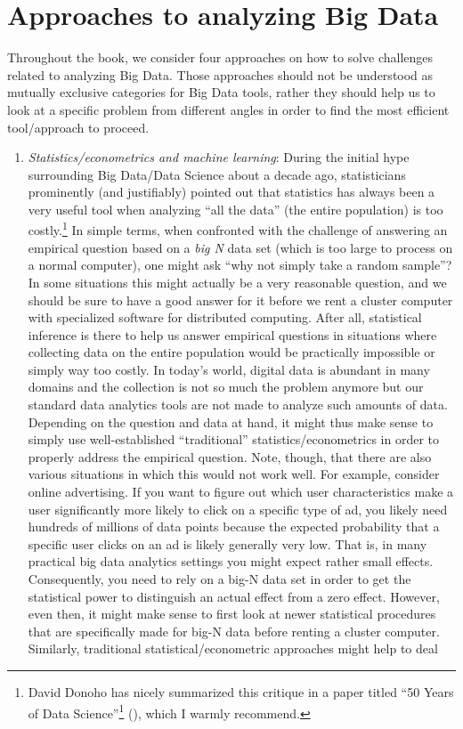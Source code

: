\documentclass[
  12pt,
]{style/krantz}
\renewcommand{\href}[2]{#2\footnote{\url{#1}}}
\begin{document}
\hypertarget{approaches-to-analyzing-big-data}{%
\chapter{Approaches to analyzing Big Data}\label{approaches-to-analyzing-big-data}}

Throughout the book, we consider four approaches on how to solve challenges related to analyzing Big Data. Those approaches should not be understood as mutually exclusive categories for Big Data tools, rather they should help us to look at a specific problem from different angles in order to find the most efficient tool/approach to proceed.

\begin{enumerate}
\def\labelenumi{\arabic{enumi}.}
\item
  \emph{Statistics/econometrics and machine learning}: During the initial hype surrounding Big Data/Data Science about a decade ago, statisticians prominently (and justifiably) pointed out that statistics has always been a very useful tool when analyzing ``all the data'' (the entire population) is too costly.\footnote{David Donoho has nicely summarized this critique in a paper titled \href{https://doi.org/10.1080/10618600.2017.1384734}{``50 Years of Data Science''} (\citet{donoho_2017}), which I warmly recommend.} In simple terms, when confronted with the challenge of answering an empirical question based on a \emph{big N} data set (which is too large to process on a normal computer), one might ask ``why not simply take a random sample''? In some situations this might actually be a very reasonable question, and we should be sure to have a good answer for it before we rent a cluster computer with specialized software for distributed computing. After all, statistical inference is there to help us answer empirical questions in situations where collecting data on the entire population would be practically impossible or simply way too costly. In today's world, digital data is abundant in many domains and the collection is not so much the problem anymore but our standard data analytics tools are not made to analyze such amounts of data. Depending on the question and data at hand, it might thus make sense to simply use well-established ``traditional'' statistics/econometrics in order to properly address the empirical question. Note, though, that there are also various situations in which this would not work well. For example, consider online advertising. If you want to figure out which user characteristics make a user significantly more likely to click on a specific type of ad, you likely need hundreds of millions of data points because the expected probability that a specific user clicks on an ad is likely generally very low. That is, in many practical big data analytics settings you might expect rather small effects. Consequently, you need to rely on a big-N data set in order to get the statistical power to distinguish an actual effect from a zero effect. However, even then, it might make sense to first look at newer statistical procedures that are specifically made for big-N data before renting a cluster computer. Similarly, traditional statistical/econometric approaches might help to deal 
\end{enumerate}
\end{document}

